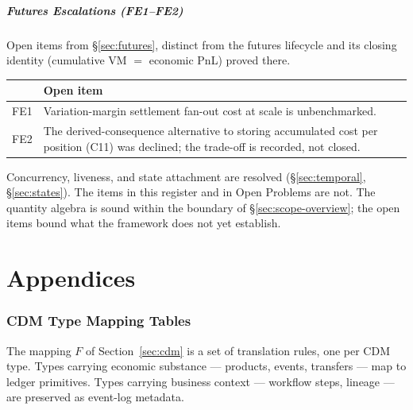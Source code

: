 \documentclass[11pt,a4paper]{article}
\begin{document}
\subsubsection{Futures Escalations (FE1--FE2)}

Open items from \S\ref{sec:futures}, distinct from the futures lifecycle and its closing identity (cumulative VM $=$ economic PnL) proved there.

\begin{longtable}{@{}p{0.5cm}p{12.6cm}@{}}
\toprule
& \textbf{Open item} \\
\midrule
\endhead
FE1 & Variation-margin settlement fan-out cost at scale is unbenchmarked. \\
FE2 & The derived-consequence alternative to storing accumulated cost per position (C11) was declined; the trade-off is recorded, not closed. \\
\bottomrule
\end{longtable}

\noindent Concurrency, liveness, and state attachment are resolved (\S\ref{sec:temporal}, \S\ref{sec:states}). The items in this register and in Open Problems are not. The quantity algebra is sound within the boundary of \S\ref{sec:scope-overview}; the open items bound what the framework does not yet establish.


\appendix
\part{Appendices}
\section{CDM Type Mapping Tables}
\label{app:cdm-mapping}

The mapping $F$ of Section~\ref{sec:cdm} is a set of translation rules, one per CDM type. Types carrying economic substance --- products, events, transfers --- map to ledger primitives. Types carrying business context --- workflow steps, lineage --- are preserved as event-log metadata.
\end{document}
